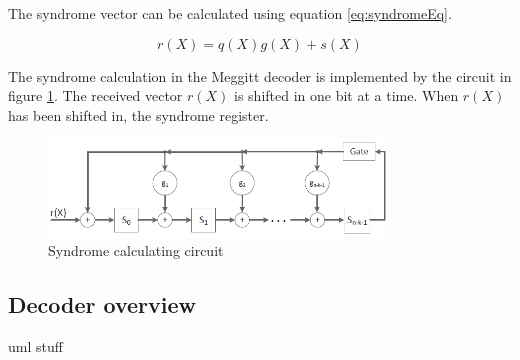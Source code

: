 \documentclass[Main]{subfiles}
\begin{document}
The syndrome vector can be calculated using equation \ref{eq:syndromeEq}.

\begin{equation} \label{eq:syndromeEq}
r(X) = q(X)g(X)+s(X)
\end{equation}

The syndrome calculation in the Meggitt decoder is implemented by the circuit in figure \ref{fig:syndromeCirc}. The received vector $r(X)$ is shifted in one bit at a time. When $r(X)$ has been shifted in, the syndrome register.

\begin{figure}[h]
    \centering
    \includegraphics[width=0.8\textwidth]{figures/syndromeCircuit.png}
    \caption{Syndrome calculating circuit}
    \label{fig:syndromeCirc}
\end{figure}



\subsection{Decoder overview}

uml stuff



\end{document}
